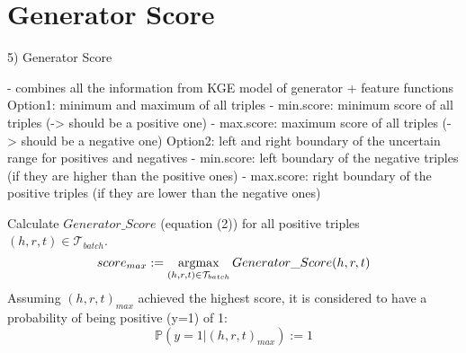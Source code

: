 \section{Generator Score} 
\label{sec:generatorscore}


5) Generator Score

- combines all the information from KGE model of generator + feature functions
Option1: minimum and maximum of all triples
- min.score: minimum score of all triples (-> should be a positive one)
- max.score: maximum score of all triples (-> should be a negative one)
Option2: left and right boundary of the uncertain range for positives and negatives
- min.score: left boundary of the negative triples (if they are higher than the positive ones)
- max.score: right boundary of the positive triples (if they are lower than the negative ones)

Calculate $Generator\_Score$ (equation (2)) for all positive triples $(h, r, t) \in \mathcal{T}_{batch}$.
\begin{equation}
    score_{max} := \operatorname*{argmax}_{(h,r,t) \in \mathcal{T}_{batch}}{Generator\_Score(h,r,t)}
\end{equation}
Assuming $(h,r,t)_{max}$ achieved the highest score, 
it is considered to have a probability of being positive (y=1) of 1:
\begin{equation}
    \mathds{P}(y = 1|(h, r, t)_{max}) := 1
\end{equation}

